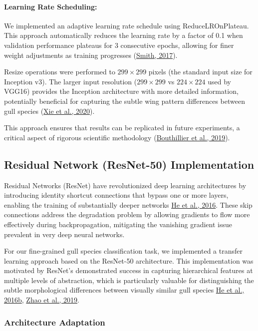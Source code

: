 \documentclass[a4paper,12pt]{article}
\begin{document}
\paragraph*{Learning Rate Scheduling:} We implemented an adaptive learning rate schedule using ReduceLROnPlateau. This approach automatically reduces the learning rate by a factor of 0.1 when validation performance plateaus for 3 consecutive epochs, allowing for finer weight adjustments as training progresses (\href{https://arxiv.org/abs/1506.01186}{Smith, 2017}).

Resize operations were performed to $299\times299$ pixels (the standard input size for Inception v3). The larger input resolution ($299\times299$ vs $224\times224$ used by VGG16) provides the Inception architecture with more detailed information, potentially beneficial for capturing the subtle wing pattern differences between gull species (\href{https://arxiv.org/abs/1911.0907}{Xie et al., 2020}).

This approach ensures that results can be replicated in future experiments, a critical aspect of rigorous scientific methodology (\href{https://arxiv.org/abs/1902.02476}{Bouthillier et al., 2019}).


\subsection{Residual Network (ResNet-50) Implementation}

Residual Networks (ResNet) have revolutionized deep learning architectures by introducing identity shortcut connections that bypass one or more layers, enabling the training of substantially deeper networks {\href{https://arxiv.org/abs/1512.03385}{He et al., 2016}}. These skip connections address the degradation problem by allowing gradients to flow more effectively during backpropagation, mitigating the vanishing gradient issue prevalent in very deep neural networks.

For our fine-grained gull species classification task, we implemented a transfer learning approach based on the ResNet-50 architecture. This implementation was motivated by ResNet's demonstrated success in capturing hierarchical features at multiple levels of abstraction, which is particularly valuable for distinguishing the subtle morphological differences between visually similar gull species {\href{https://arxiv.org/abs/1603.05027}{He et al., 2016b}, \href{https://ieeexplore.ieee.org/document/8658831}{Zhao et al., 2019}}.

\subsubsection{Architecture Adaptation}
\end{document}
